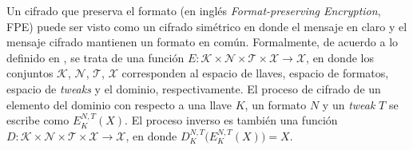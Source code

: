 Un cifrado que preserva el formato (en inglés \textit{Format-preserving
Encryption}, FPE) puede ser visto como un cifrado simétrico en donde el mensaje
en claro y el mensaje cifrado mantienen un formato en común. Formalmente, de
acuerdo a lo definido en \cite{DBLP:conf/sacrypt/BellareRRS09}, se trata de una
función $ E: \mathcal{K} \times \mathcal{N} \times \mathcal{T} \times
\mathcal{X} \rightarrow \mathcal{X} $, en donde los conjuntos $ \mathcal{K} $, $
\mathcal{N} $, $ \mathcal{T} $, $ \mathcal{X} $ corresponden al espacio de
llaves, espacio de formatos, espacio de \textit{tweaks} y el dominio,
respectivamente. El proceso de cifrado de un elemento del dominio con respecto a
una llave $ K $, un formato $ N $ y un \textit{tweak} $ T $ se escribe como  $
E_K^{N,T}(X) $. El proceso inverso es también una función $ D: \mathcal{K}
\times \mathcal{N} \times \mathcal{T} \times \mathcal{X} \rightarrow \mathcal{X}
$, en donde $ D_K^{N,T}\big( E_K^{N,T}(X) \big) = X $.







